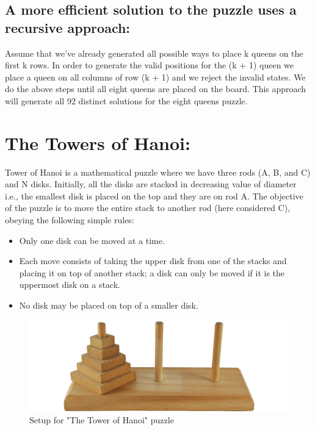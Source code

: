 \documentclass[12pt,a4paper]{article}
\begin{document}
\subsection{A more efficient solution to the puzzle uses a recursive approach:}
Assume that we’ve already generated all possible ways to place k queens on the first k rows. In order to generate the valid positions for the (k + 1) queen we place a queen on all columns of row (k + 1) and we reject the invalid states. We do the above steps until all eight queens are placed on the board. This approach will generate all 92 distinct solutions for the eight queens puzzle.
\section{The Towers of Hanoi:}
Tower of Hanoi is a mathematical puzzle where we have three rods (A, B, and C) and N disks. Initially, all the disks are stacked in decreasing value of diameter i.e., the smallest disk is placed on the top and they are on rod A. The objective of the puzzle is to move the entire stack to another rod (here considered C), obeying the following simple rules:
\begin{itemize}
\item Only one disk can be moved at a time.
\item Each move consists of taking the upper disk from one of the stacks and placing it on top of another stack; a disk can only be moved if it is the uppermost disk on a stack.
\item No disk may be placed on top of a smaller disk.
\end{itemize}
\begin{figure}[!h]
	\begin{center}
			\includegraphics[scale=0.8]{Figure_6.jpg}
	\end{center}
	\caption{Setup for "The Tower of Hanoi" puzzle }
\end{figure}
\end{document}
